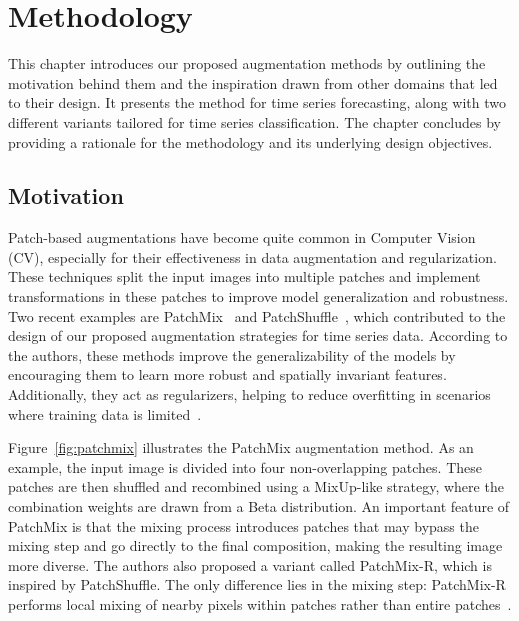 \chapter{Methodology}

This chapter introduces our proposed augmentation methods by outlining the motivation behind them and the inspiration drawn from other domains that led to their design. It presents the method for time series forecasting, along with two different variants tailored for time series classification. The chapter concludes by providing a rationale for the methodology and its underlying design objectives.

\section{Motivation}


Patch-based augmentations have become quite common in Computer Vision (CV), especially for their effectiveness in data augmentation and regularization. These techniques split the input images into multiple patches and implement transformations in these patches to improve model generalization and robustness. Two recent examples are PatchMix~\cite{hong2024patchmix} and PatchShuffle~\cite{kang2017patchshuffleregularization}, which contributed to the design of our proposed augmentation strategies for time series data. According to the authors, these methods improve the generalizability of the models by encouraging them to learn more robust and spatially invariant features. Additionally, they act as regularizers, helping to reduce overfitting in scenarios where training data is limited~\cite{kang2017patchshuffleregularization, hong2024patchmix}.



Figure~\ref{fig:patchmix} illustrates the PatchMix augmentation method. As an example, the input image is divided into four non-overlapping patches. These patches are then shuffled and recombined using a MixUp-like strategy, where the combination weights are drawn from a Beta distribution. An important feature of PatchMix is that the mixing process introduces patches that may bypass the mixing step and go directly to the final composition, making the resulting image more diverse. The authors also proposed a variant called PatchMix-R, which is inspired by PatchShuffle. The only difference lies in the mixing step: PatchMix-R performs local mixing of nearby pixels within patches rather than entire patches~\cite{hong2024patchmix}.



